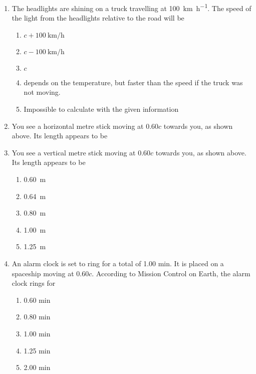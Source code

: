 \begin{enumerate}[itemsep=6pt]
\item The headlights are shining on a truck travelling at
  \SI{100}{\kilo\metre\per\hour}. The speed of the light from the headlights
  relative to the road will be
  \begin{enumerate}
  \item $c+\SI{100}{\kilo\metre\per\hour}$
  \item $c-\SI{100}{\kilo\metre\per\hour}$
  \item $c$
  \item depends on the temperature, but faster than the speed if the truck
    was not moving.
  \item Impossible to calculate with the given information 
  \end{enumerate}
%
\item You see a horizontal metre stick moving at $0.60c$ towards you, as
  shown above. Its length appears to be
%
\item You see a vertical metre stick moving at $0.60c$ towards you, as
  shown above. Its length appears to be
  \begin{enumerate}
  \item\SI{.60}\metre 
  \item\SI{.64}\metre 
  \item\SI{.80}\metre 
  \item\SI{1.00}\metre 
  \item\SI{1.25}\metre
  \end{enumerate}
  
\item An alarm clock is set to ring for a total of 1.00 min. It is placed
  on a spaceship moving at $0.60c$. According to Mission Control on Earth, the
  alarm clock rings for
  \begin{enumerate}
  \item 0.60 min
  \item 0.80 min
  \item 1.00 min
  \item 1.25 min
  \item 2.00 min
  \end{enumerate}


\end{enumerate}

